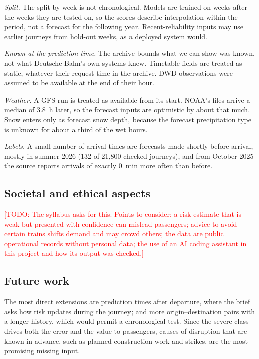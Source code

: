 \documentclass[conference]{IEEEtran}
\newcommand{\todo}[1]{\textcolor{red}{[TODO: #1]}}
\begin{document}
\emph{Split.} The split by week is not chronological. Models are trained on weeks after the weeks
they are tested on, so the scores describe interpolation within the period, not a forecast for the
following year. Recent-reliability inputs may use earlier journeys from hold-out weeks, as a
deployed system would.

\emph{Known at the prediction time.} The archive bounds what we can show was known, not what Deutsche
Bahn's own systems knew. Timetable fields are treated as static, whatever their request time in the archive. DWD observations were assumed to be available at the end of their hour.

\emph{Weather.} A GFS run is treated as available from its start. NOAA's files arrive a median of
3.8~h later, so the forecast inputs are optimistic by about that much. Snow enters only as forecast
snow depth, because the forecast precipitation type is unknown for about a third of the wet hours.

\emph{Labels.} A small number of arrival times are forecasts made shortly before arrival, mostly in
summer 2026 (132 of 21{,}800 checked journeys), and from October 2025 the source reports arrivals of
exactly 0~min more often than before.

\subsection{Societal and ethical aspects}

\todo{The syllabus asks for this. Points to consider: a risk estimate that is weak but presented
with confidence can mislead passengers; advice to avoid certain trains shifts demand and may crowd
others; the data are public operational records without personal data; the use of an AI coding
assistant in this project and how its output was checked.}

\subsection{Future work}

The most direct extensions are prediction times after departure, where the brief asks how risk updates during the journey; and more
origin--destination pairs with a longer history, which would permit a chronological test. Since the
severe class drives both the error and the value to passengers, causes of disruption that are known
in advance, such as planned construction work and strikes, are the most promising missing input.
\end{document}
